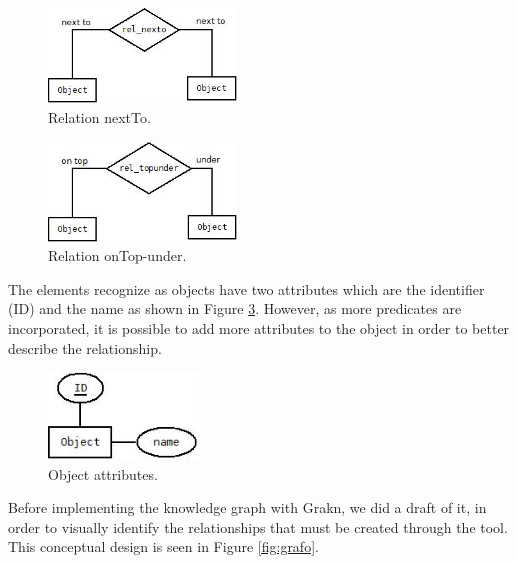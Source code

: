 \begin{figure}[H]
    \centering
    \includegraphics[width=5cm]{figures/nextto.jpg}
    \caption{Relation nextTo.}
    \label{fig:nexto}
\end{figure}

\begin{figure}[H]
    \centering
    \includegraphics[width=5cm]{figures/topunder.jpg}
    \caption{Relation onTop-under.}
    \label{fig:topUnder}
\end{figure}

The elements recognize as objects have two attributes which are the identifier 
(ID) and the name as shown in Figure \ref{fig:object}. However, as more 
predicates are incorporated, it is possible to add more attributes to the 
object in order to better describe the relationship.


\begin{figure}[H]
    \centering
    \includegraphics[width=4cm]{figures/object.jpg}
    \caption{Object attributes.}
    \label{fig:object}
\end{figure}

Before implementing the knowledge graph with Grakn, we did a draft of it, 
in order to visually identify the relationships that must be created through 
the tool. This conceptual design is seen in Figure \ref{fig:grafo}.

